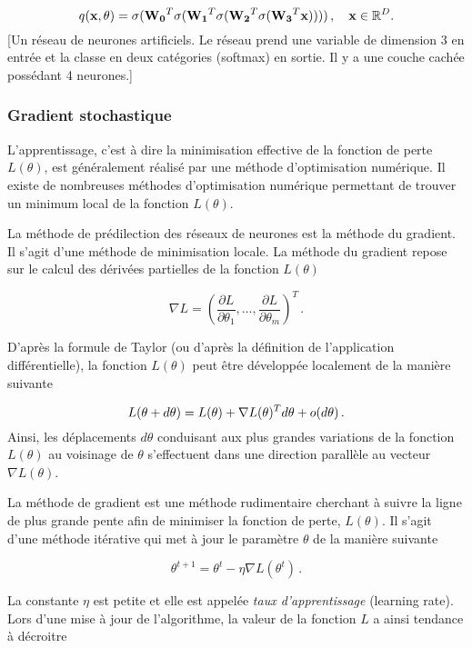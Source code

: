 \documentclass[]{article}
\begin{document}
\[
 q({\bf x}, {\bf \theta}) = \sigma( {\bf W_0}^T \sigma({\bf W_1}^T \sigma({\bf W_2}^T \sigma({\bf W_3}^T{\bf x})))) \, , \quad {\bf x} \in \mathbb{R}^D.
\] {[}Un réseau de neurones artificiels. Le réseau prend une variable de
dimension 3 en entrée et la classe en deux catégories (softmax) en
sortie. Il y a une couche cachée possédant 4 neurones.{]}

\subsubsection{Gradient stochastique}\label{gradient-stochastique}

L'apprentissage, c'est à dire la minimisation effective de la fonction
de perte \(L(\theta)\), est généralement réalisé par une méthode
d'optimisation numérique. Il existe de nombreuses méthodes
d'optimisation numérique permettant de trouver un minimum local de la
fonction \(L(\theta)\).

La méthode de prédilection des réseaux de neurones est la méthode du
gradient. Il s'agit d'une méthode de minimisation locale. La méthode du
gradient repose sur le calcul des dérivées partielles de la fonction
\(L(\theta)\)

\[
\nabla L = \left( \frac{\partial L}{\partial \theta_1} , \dots, \frac{\partial L}{\partial \theta_m} \right)^T \,.
\]

D'après la formule de Taylor (ou d'après la définition de l'application
différentielle), la fonction \(L(\theta)\) peut être développée
localement de la manière suivante

\[
L(\theta + d\theta) = L(\theta) + {\bf \nabla} L(\theta)^T d\theta + o(d\theta) \, .
\] Ainsi, les déplacements \(d\theta\) conduisant aux plus grandes
variations de la fonction \(L(\theta)\) au voisinage de \(\theta\)
s'effectuent dans une direction parallèle au vecteur
\(\nabla L(\theta)\).

La méthode de gradient est une méthode rudimentaire cherchant à suivre
la ligne de plus grande pente afin de minimiser la fonction de perte,
\(L(\theta)\). Il s'agit d'une méthode itérative qui met à jour le
paramètre \(\theta\) de la manière suivante

\[
\theta^{t+1} = \theta^t - \eta \nabla L(\theta^t) \, .
\]

La constante \(\eta\) est petite et elle est appelée \emph{taux
d'apprentissage} (learning rate). Lors d'une mise à jour de
l'algorithme, la valeur de la fonction \(L\) a ainsi tendance à
décroitre
\end{document}

